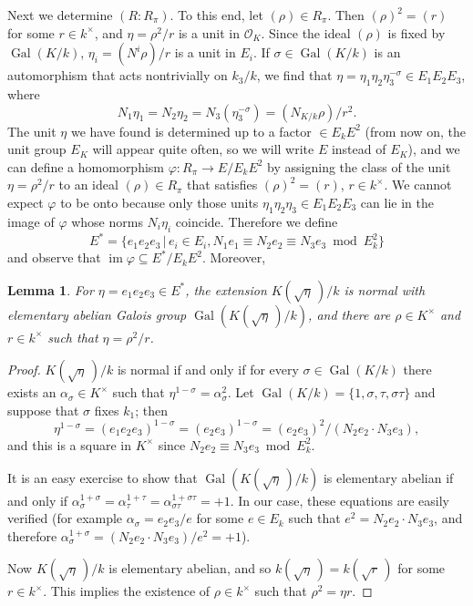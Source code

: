 \documentclass{amsart}
\newcommand{\OO}{{\mathcal O}}
\newcommand{\sth}{\,|\,}
\newcommand{\Gal}{\operatorname{Gal}}
\newcommand{\lra}{\longrightarrow}
\newcommand{\im}{\operatorname{im}}
\newtheorem{lemma}{Lemma}
\begin{document}
Next we determine $(R:R_\pi)$. To this end, let $(\rho) \in R_\pi$.
Then $(\rho)^2 = (r)$ for some $r \in k^\times$, and $\eta = \rho^2/r$
is a unit in $\OO_K$. Since the ideal $(\rho)$ is fixed by
$\Gal(K/k)$, $\eta_i = (N^i \rho)/r$ is a unit in $E_i$. If
$\sigma \in \Gal(K/k)$ is an automorphism that acts nontrivially
on $k_3/k$, we find that $\eta = \eta_1\eta_2\eta_3^{-\sigma}
\in E_1E_2E_3$, where
$$ N_1 \eta_1 = N_2 \eta_2 = N_3 (\eta_3^{-\sigma})
   = (N_{K/k} \rho)/r^2. $$
The unit $\eta$ we have found is determined up to a factor
$\in E_kE^2$ (from now on, the unit group $E_K$ will appear
quite often, so we will write $E$ instead of $E_K$), and we
can define a homomorphism $\varphi: R_\pi \lra E/E_kE^2$ by
assigning the class of the unit $\eta = \rho^2/r$ to an
ideal $(\rho) \in R_\pi$ that satisfies $(\rho)^2 = (r)$,
$r \in k^\times$.  We cannot expect $\varphi$ to be onto because
only those units $\eta_1\eta_2\eta_3 \in E_1E_2E_3$ can
lie in the image of $\varphi$ whose norms $N_i \eta_i$ coincide.
Therefore we define
$$ E^* = \{ e_1e_2e_3 \sth e_i \in E_i,
  N_1e_1 \equiv N_2 e_2 \equiv N_3  e_3 \bmod E_k^2\} $$
and observe that $\im \varphi \subseteq E^*/E_kE^2$. Moreover,

\begin{lemma}\label{L2.9}
For $\eta = e_1e_2e_3 \in E^*$, the extension
$K(\sqrt{\eta}\,)/k$ is normal with elementary abelian
Galois group $\Gal(K(\sqrt{\eta}\,)/k)$, and there are
$\rho \in K^\times$ and $r \in k^\times$ such that
$\eta = \rho^2/r$.
\end{lemma}


\begin{proof}
$K(\sqrt{\eta}\,)/k$ is normal if and only if for every
$\sigma \in \Gal(K/k)$ there exists an $\alpha_\sigma \in K^\times$
such that $\eta^{1-\sigma} = \alpha_\sigma^2$. Let
$\Gal(K/k) = \{1,\sigma, \tau, \sigma\tau\}$ and suppose
that $\sigma$ fixes $k_1$; then
$$ \eta^{1-\sigma} = (e_1e_2e_3)^{1-\sigma}
   = (e_2e_3)^{1-\sigma} = (e_2e_3)^2/(N_2e_2 \cdot N_3e_3),$$
and this is a square in $K^\times$ since
$N_2e_2 \equiv N_3e_3 \bmod E_k^2$.

It is an easy exercise to show that $\Gal(K(\sqrt{\eta}\,)/k)$
is elementary abelian if and only if $\alpha_\sigma^{1+\sigma}
 = \alpha_\tau^{1+\tau} = \alpha_{\sigma\tau}^{1+\sigma\tau} = +1$.
In our case, these equations are easily verified (for example
$\alpha_\sigma = e_2e_3/e$ for some $e \in E_k$ such that
$e^2 = N_2e_2 \cdot N_3 e_3$, and therefore
$\alpha_\sigma^{1+\sigma} = (N_2e_2 \cdot N_3e_3)/e^2 = +1$).

Now $K(\sqrt{\eta}\,)/k$ is elementary abelian, and so
$k(\sqrt{\eta}\,) = k(\sqrt{r}\,)$ for some $r \in k^\times$.
This implies the existence of $\rho \in k^\times$ such that
$\rho^2 = \eta r$.
\end{proof}
\end{document}
